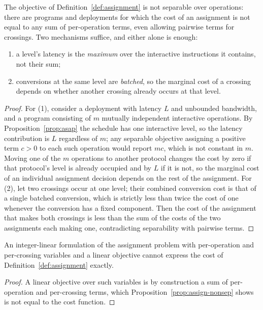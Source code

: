 \begin{proposition}
\label{prop:assign-nonsep}
The objective of Definition~\ref{def:assignment} is not separable over operations:
there are programs and deployments for which the cost of an assignment is not
equal to any sum of per-operation terms, even allowing pairwise terms for
crossings. Two mechanisms suffice, and either alone is enough:
\begin{enumerate}
  \item a level's latency is the \emph{maximum} over the interactive instructions
  it contains, not their sum;
  \item conversions at the same level are \emph{batched}, so the marginal cost of a
  crossing depends on whether another crossing already occurs at that level.
\end{enumerate}
\end{proposition}

\begin{proof}
For (1), consider a deployment with latency $L$ and unbounded bandwidth, and a
program consisting of $m$ mutually independent interactive operations. By
Proposition~\ref{prop:asap} the schedule has one interactive level, so the latency
contribution is $L$ regardless of $m$; any separable objective assigning a
positive term $c > 0$ to each such operation would report $mc$, which is not
constant in $m$. Moving one of the $m$ operations to another protocol changes the
cost by zero if that protocol's level is already occupied and by $L$ if it is not,
so the marginal cost of an individual assignment decision depends on the rest of
the assignment. For (2), let two crossings occur at one level; their combined
conversion cost is that of a single batched conversion, which is strictly less than
twice the cost of one whenever the conversion has a fixed component. Then the cost
of the assignment that makes both crossings is less than the sum of the costs of
the two assignments each making one, contradicting separability with pairwise
terms.
\end{proof}

\begin{corolary}
\label{cor:no-ilp}
An integer-linear formulation of the assignment problem with per-operation and
per-crossing variables and a linear objective cannot express the cost of
Definition~\ref{def:assignment} exactly.
\end{corolary}

\begin{proof}
A linear objective over such variables is by construction a sum of per-operation
and per-crossing terms, which Proposition~\ref{prop:assign-nonsep} shows is not
equal to the cost function.
\end{proof}

